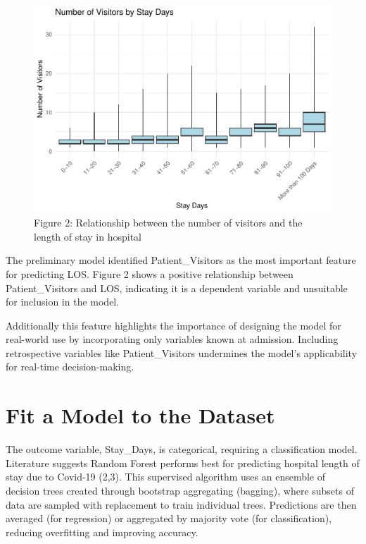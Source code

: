 \documentclass[
]{article}
\begin{document}
\begin{figure}

{\centering \includegraphics[width=0.9\linewidth]{B273025_final_big_data_rmd_final_files/figure-latex/unnamed-chunk-6-1} 

}

\caption{Figure 2: Relationship between the number of visitors and the length of stay in hospital}\label{fig:unnamed-chunk-6}
\end{figure}

The preliminary model identified Patient\_Visitors as the most important
feature for predicting LOS. Figure 2 shows a positive relationship
between Patient\_Visitors and LOS, indicating it is a dependent variable
and unsuitable for inclusion in the model.

Additionally this feature highlights the importance of designing the
model for real-world use by incorporating only variables known at
admission. Including retrospective variables like Patient\_Visitors
undermines the model's applicability for real-time decision-making.

\section{Fit a Model to the Dataset}\label{fit-a-model-to-the-dataset}

The outcome variable, Stay\_Days, is categorical, requiring a
classification model. Literature suggests Random Forest performs best
for predicting hospital length of stay due to Covid-19 (2,3). This
supervised algorithm uses an ensemble of decision trees created through
bootstrap aggregating (bagging), where subsets of data are sampled with
replacement to train individual trees. Predictions are then averaged
(for regression) or aggregated by majority vote (for classification),
reducing overfitting and improving accuracy.
\end{document}
